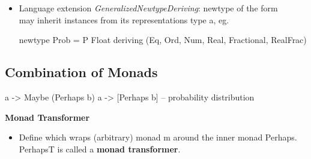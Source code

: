 \begin{itemize}
    \item Language extension \emph{GeneralizedNewtypeDeriving}: newtype of the form \\  may inherit instances from its representations type a, eg.
    \begin{codebox}[haskell]
    newtype Prob = P Float
        deriving (Eq, Ord, Num, Real, Fractional, RealFrac)
    \end{codebox}
\end{itemize}



\subsection*{Combination of Monads}

\begin{codebox}[haskell]
a -> Maybe (Perhaps b)
a -> [Perhaps b] -- probability distribution
\end{codebox}


\textbf{Monad Transformer}
\begin{itemize}
    \item Define  which wraps (arbitrary) monad m around the inner monad Perhaps. PerhapsT is called a \textbf{monad transformer}.
\end{itemize}



















